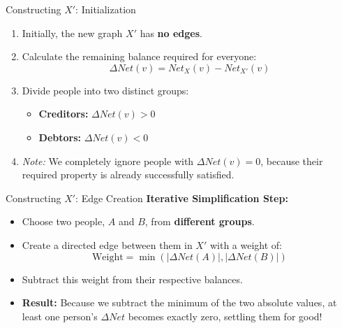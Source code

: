 \documentclass{beamer}
\begin{document}
\begin{frame}{Constructing $X'$: Initialization}
    \begin{enumerate}
        \item Initially, the new graph $X'$ has \textbf{no edges}.
        \vspace{0.2cm}
        \item Calculate the remaining balance required for everyone:
        \[ \Delta Net(v) = Net_{X}(v) - Net_{X'}(v) \]
        \item Divide people into two distinct groups:
        \begin{itemize}
            \item \textbf{Creditors:} $\Delta Net(v) > 0$
            \item \textbf{Debtors:} $\Delta Net(v) < 0$
        \end{itemize}
        \vspace{0.2cm}
        \item[] \textit{Note:} We completely ignore people with $\Delta Net(v) = 0$, because their required property is already successfully satisfied.
    \end{enumerate}
\end{frame}

\begin{frame}{Constructing $X'$: Edge Creation}
    \textbf{Iterative Simplification Step:}

    \vspace{0.3cm}
    \begin{itemize}
        \item Choose two people, $A$ and $B$, from \textbf{different groups}.
        \vspace{0.2cm}
        \item Create a directed edge between them in $X'$ with a weight of:
        \[ \text{Weight} = \min(|\Delta Net(A)|, |\Delta Net(B)|) \]
        \vspace{0.2cm}
        \item Subtract this weight from their respective balances.
        \vspace{0.2cm}
        \item \textbf{Result:} Because we subtract the minimum of the two absolute values, at least one person's $\Delta Net$ becomes exactly zero, settling them for good!
    \end{itemize}
\end{frame}
\end{document}

